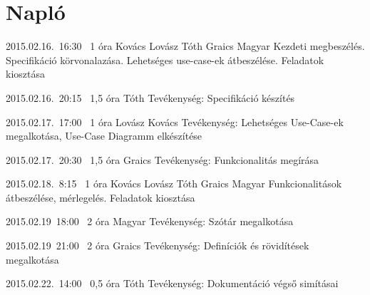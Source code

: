 %
\section{Napló}

\begin{naplo}

\bejegyzes
{2015.02.16.~16:30~} %
{1 óra} %
{Kovács\newline
Lovász\newline
Tóth\newline
Graics\newline
Magyar
} %
{Kezdeti megbeszélés. Specifikáció körvonalazása. Lehetséges use-case-ek átbeszélése. Feladatok kiosztása} %

\bejegyzes
{2015.02.16.~20:15~}
{1,5 óra}
{Tóth}
{Tevékenység: Specifikáció készítés}

\bejegyzes
{2015.02.17.~17:00~}
{1 óra}
{Lovász\newline
Kovács}
{Tevékenység: Lehetséges Use-Case-ek megalkotása, Use-Case Diagramm elkészítése}

\bejegyzes
{2015.02.17.~20:30~}
{1,5 óra}
{Graics}
{Tevékenység: Funkcionalitás megírása}

\bejegyzes
{2015.02.18.~8:15~} %
{1 óra} %
{Kovács\newline
Lovász\newline
Tóth\newline
Graics\newline
Magyar
} %
{Funkcionalitások átbeszélése, mérlegelés. Feladatok kiosztása}


\bejegyzes
{2015.02.19~18:00~}
{2 óra}
{Magyar}
{Tevékenység: Szótár megalkotása}

\bejegyzes
{2015.02.19~21:00~}
{2 óra}
{Graics}
{Tevékenység: Definíciók és rövidítések megalkotása}

\bejegyzes
{2015.02.22.~14:00~}
{0,5 óra}
{Tóth}
{Tevékenység: Dokumentáció végső simításai}

\end{naplo}